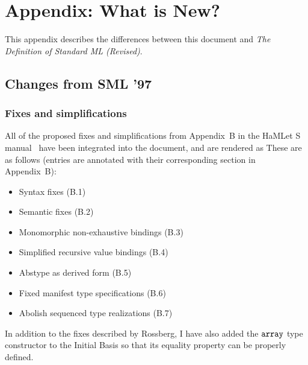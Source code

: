 %

\section{Appendix: What is New?}
\label{whatisnew-app}

This appendix describes the differences between this document and
\emph{The Definition of Standard ML (Revised)}.

\subsection{Changes from SML '97}

\subsubsection{Fixes and simplifications}
All of the proposed fixes and simplifications from Appendix~B in the
HaMLet S manual~\cite{hamlet-s} have been integrated into the document,
and are rendered as 
These are as follows (entries are annotated with their corresponding
section in Appendix~B):
\begin{itemize}
\setlength{\itemsep}{0em}
\item Syntax fixes (B.1)
\item Semantic fixes (B.2)
\item Monomorphic non-exhaustive bindings (B.3)
\item Simplified recursive value bindings (B.4)
\item Abstype as derived form (B.5)
\item Fixed manifest type specifications (B.6)
\item Abolish sequenced type realizations (B.7)
\end{itemize}%

In addition to the fixes described by Rossberg, I have also added the $\mbox{\tt array}$ type constructor
to the Initial Basis so that its equality property can be properly defined.


